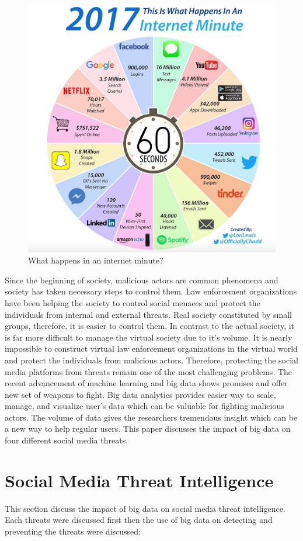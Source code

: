 \documentclass[sigconf]{acmart}
\begin{document}
\begin{figure}[!ht]
  \centering\includegraphics[width=0.5\columnwidth]{images/one-internet-minute.png}
  \caption{What happens in an internet minute?~\cite{social-media2}}\label{f:socialmedia}
\end{figure}

Since the beginning of society, malicious actors are common phenomena and society has taken necessary steps to control them. Law enforcement organizations have been helping the society to control social menaces and protect the individuals from internal and external threats.  Real society constituted by small groups, therefore, it is easier to control  them. In contrast to the actual society, it is far more difficult to manage the virtual society due to it's volume. It is nearly impossible to construct virtual law enforcement organizations in the virtual world and protect the individuals from malicious actors. Therefore, protecting the social media platforms from threats remain one of the most challenging problems. The recent advancement of machine learning and big data shows promises and offer new set of weapons to fight. Big data analytics provides easier way to scale, manage, and visualize user's data which can be valuable for fighting malicious actors. The volume of data gives the researchers tremendous insight which can be a new way to help regular users. This paper discusses the impact of big data on four different social media threats.

\section{Social Media Threat Intelligence}
This section discuss the impact of big data on social media threat intelligence. Each threats were discussed first then the use of big data on detecting and preventing the threats were discussed:
\end{document}
